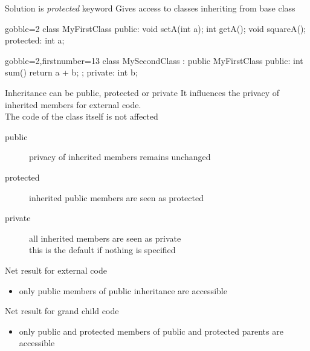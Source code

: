 \begin{frame}[fragile]
  \begin{block}{Solution is {\it protected} keyword}
    Gives access to classes inheriting from base class
  \end{block}
  \begin{multicols}{2}
    \begin{cppcode*}{gobble=2}
      class MyFirstClass {
      public:
        void setA(int a);
        int getA();
        void squareA();
      protected:
        int a;
      }
    \end{cppcode*}
    \columnbreak
    \begin{cppcode*}{gobble=2,firstnumber=13}
      class MySecondClass :
        public MyFirstClass {
      public:
        int sum() {
          return a + b;
        };
      private:
        int b;
      }
    \end{cppcode*}
  \end{multicols}
\end{frame}

\begin{frame}[fragile]
  \begin{block}{Inheritance can be public, protected or private}
    It influences the privacy of inherited members for external code.\\
    The code of the class itself is not affected
    \begin{description}
    \item[public] privacy of inherited members remains unchanged
    \item[protected] inherited public members are seen as protected
    \item[private] all inherited members are seen as private \\
      this is the default if nothing is specified
    \end{description}
  \end{block}
  \pause
  \begin{block}{Net result for external code}
    \begin{itemize}
    \item only public members of public inheritance are accessible
    \end{itemize}
  \end{block}
  \begin{block}{Net result for grand child code}
    \begin{itemize}
    \item only public and protected members of public and protected parents are accessible
    \end{itemize}
  \end{block}
\end{frame}

